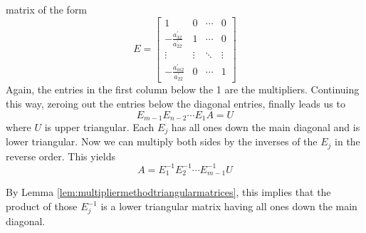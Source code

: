 \documentclass{ximera}
\begin{document}
matrix of the form
\begin{equation*}
E=\begin{bmatrix}
1 & 0 & \cdots & 0 \\
-\frac{a_{32}^{\prime }}{a_{22}^{\prime }} & 1 & \cdots & 0 \\
\vdots & \vdots & \ddots & \vdots \\
-\frac{a_{m2}^{\prime }}{a_{22}^{\prime }} & 0 & \cdots & 1
\end{bmatrix}
\end{equation*}
Again, the entries in the first column below the 1 are the multipliers.
Continuing this way, zeroing out the entries below the diagonal entries, finally leads us to
\begin{equation*}
E_{m-1}E_{n-2}\cdots E_{1}A=U
\end{equation*}
where $U$ is upper triangular. Each $E_{j}$ has all ones down the main diagonal and is lower triangular. Now we can multiply both sides by the inverses of the $E_{j}$ in the reverse order. This yields
\begin{equation*}
A=E_{1}^{-1}E_{2}^{-1}\cdots E_{m-1}^{-1}U
\end{equation*}

By Lemma \ref{lem:multipliermethodtriangularmatrices}, this implies that the product of those $E_{j}^{-1}$
is a lower triangular matrix having all ones down the main diagonal.
\end{document}
